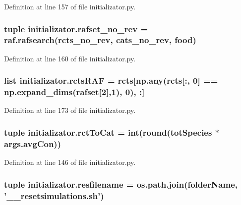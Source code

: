 Definition at line 157 of file initializator.\-py.

\hypertarget{a00104_a233edb9c8bdc6d737256db839206b8eb}{
\subsubsection[{rafset\-\_\-no\-\_\-rev}]{\setlength{\rightskip}{0pt plus 5cm}tuple initializator.\-rafset\-\_\-no\-\_\-rev = raf.\-rafsearch(rcts\-\_\-no\-\_\-rev, cats\-\_\-no\-\_\-rev, {\bf food})}}\label{a00104_a233edb9c8bdc6d737256db839206b8eb}


Definition at line 160 of file initializator.\-py.

\hypertarget{a00104_abe8833f234aa05e56487667d4f14d712}{
\subsubsection[{rcts\-R\-A\-F}]{\setlength{\rightskip}{0pt plus 5cm}list initializator.\-rcts\-R\-A\-F = rcts\mbox{[}np.\-any(rcts\mbox{[}\-:, 0\mbox{]} == np.\-expand\-\_\-dims({\bf rafset}\mbox{[}2\mbox{]},1), 0), \-:\mbox{]}}}\label{a00104_abe8833f234aa05e56487667d4f14d712}


Definition at line 173 of file initializator.\-py.

\hypertarget{a00104_afee9c574290c862d3ad8a51a77b2a72e}{
\subsubsection[{rct\-To\-Cat}]{\setlength{\rightskip}{0pt plus 5cm}tuple initializator.\-rct\-To\-Cat = int(round({\bf tot\-Species} $\ast$ args.\-avg\-Con))}}\label{a00104_afee9c574290c862d3ad8a51a77b2a72e}


Definition at line 146 of file initializator.\-py.

\hypertarget{a00104_abd0e948553283c71e145460abdb3e766}{
\subsubsection[{resfilename}]{\setlength{\rightskip}{0pt plus 5cm}tuple initializator.\-resfilename = os.\-path.\-join({\bf folder\-Name}, '\-\_\-\-\_\-resetsimulations.\-sh')}}\label{a00104_abd0e948553283c71e145460abdb3e766}


